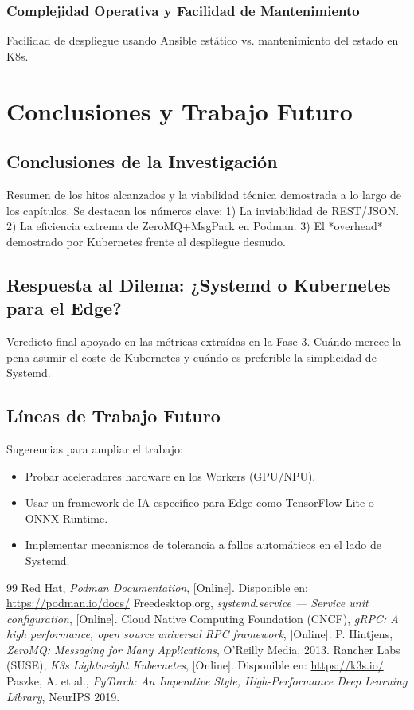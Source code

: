 \documentclass[11pt, a4paper]{report}
\begin{document}
\subsection{Complejidad Operativa y Facilidad de Mantenimiento}
Facilidad de despliegue usando Ansible estático vs. mantenimiento del estado en K8s.

\chapter{Conclusiones y Trabajo Futuro}

\section{Conclusiones de la Investigación}
Resumen de los hitos alcanzados y la viabilidad técnica demostrada a lo largo de los capítulos. 
Se destacan los números clave: 
1) La inviabilidad de REST/JSON. 
2) La eficiencia extrema de ZeroMQ+MsgPack en Podman. 
3) El *overhead* demostrado por Kubernetes frente al despliegue desnudo.

\section{Respuesta al Dilema: ¿Systemd o Kubernetes para el Edge?}
Veredicto final apoyado en las métricas extraídas en la Fase 3. Cuándo merece la pena asumir el coste de Kubernetes y cuándo es preferible la simplicidad de Systemd.

\section{Líneas de Trabajo Futuro}
Sugerencias para ampliar el trabajo:
\begin{itemize}
    \item Probar aceleradores hardware en los Workers (GPU/NPU).
    \item Usar un framework de IA específico para Edge como TensorFlow Lite o ONNX Runtime.
    \item Implementar mecanismos de tolerancia a fallos automáticos en el lado de Systemd.
\end{itemize}

\vspace{1cm}

\begin{thebibliography}{99}
 Red Hat, \textit{Podman Documentation}, [Online]. Disponible en: \url{https://podman.io/docs/}
 Freedesktop.org, \textit{systemd.service — Service unit configuration}, [Online].
 Cloud Native Computing Foundation (CNCF), \textit{gRPC: A high performance, open source universal RPC framework}, [Online].
 P. Hintjens, \textit{ZeroMQ: Messaging for Many Applications}, O'Reilly Media, 2013.
 Rancher Labs (SUSE), \textit{K3s Lightweight Kubernetes}, [Online]. Disponible en: \url{https://k3s.io/}
 Paszke, A. et al., \textit{PyTorch: An Imperative Style, High-Performance Deep Learning Library}, NeurIPS 2019.
\end{thebibliography}
\end{document}
